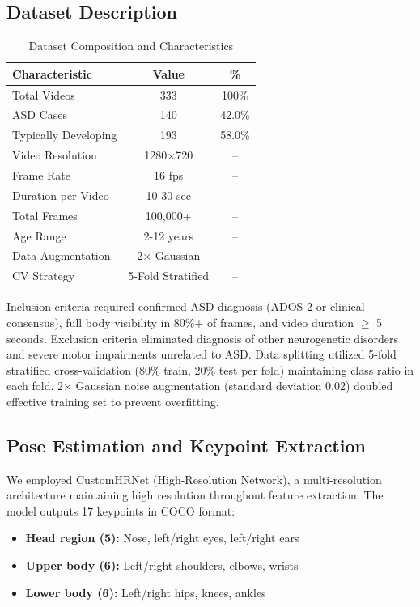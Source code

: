 \documentclass[conference]{IEEEtran}
\begin{document}
\subsection{Dataset Description}

\begin{table}[H]
\centering
\caption{Dataset Composition and Characteristics}
\begin{tabular}{lcc}
\toprule
\textbf{Characteristic} & \textbf{Value} & \textbf{\%} \\
\midrule
Total Videos & 333 & 100\% \\
ASD Cases & 140 & 42.0\% \\
Typically Developing & 193 & 58.0\% \\
\midrule
Video Resolution & 1280$\times$720 & -- \\
Frame Rate & 16 fps & -- \\
Duration per Video & 10-30 sec & -- \\
Total Frames & 100,000+ & -- \\
\midrule
Age Range & 2-12 years & -- \\
Data Augmentation & 2$\times$ Gaussian & -- \\
CV Strategy & 5-Fold Stratified & -- \\
\bottomrule
\end{tabular}
\label{tab:dataset}
\end{table}

Inclusion criteria required confirmed ASD diagnosis (ADOS-2 or clinical consensus), full body visibility in 80\%+ of frames, and video duration $\geq$ 5 seconds. Exclusion criteria eliminated diagnosis of other neurogenetic disorders and severe motor impairments unrelated to ASD. Data splitting utilized 5-fold stratified cross-validation (80\% train, 20\% test per fold) maintaining class ratio in each fold. 2$\times$ Gaussian noise augmentation (standard deviation 0.02) doubled effective training set to prevent overfitting.

\subsection{Pose Estimation and Keypoint Extraction}

We employed CustomHRNet (High-Resolution Network), a multi-resolution architecture maintaining high resolution throughout feature extraction. The model outputs 17 keypoints in COCO format:
\begin{itemize}
\item \textbf{Head region (5):} Nose, left/right eyes, left/right ears
\item \textbf{Upper body (6):} Left/right shoulders, elbows, wrists
\item \textbf{Lower body (6):} Left/right hips, knees, ankles
\end{itemize}
\end{document}
